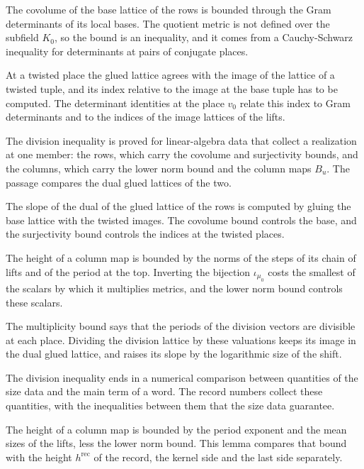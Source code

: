 The covolume of the base lattice of the rows is bounded through the Gram determinants of its local
bases. The quotient metric is not defined over the subfield $K_0$, so the bound is an inequality,
and it comes from a Cauchy-Schwarz inequality for determinants at pairs of conjugate places.

At a twisted place the glued lattice agrees with the image of the lattice of a twisted tuple, and
its index relative to the image at the base tuple has to be computed. The determinant identities at
the place $v_0$ relate this index to Gram determinants and to the indices of the image lattices of
the lifts.

The division inequality is proved for linear-algebra data that collect a realization at one
member: the rows, which carry the covolume and surjectivity bounds, and the columns, which carry the
lower norm bound and the column maps $B_u$. The passage compares the dual glued lattices of the two.

The slope of the dual of the glued lattice of the rows is computed by gluing the base lattice with
the twisted images. The covolume bound controls the base, and the surjectivity bound controls the
indices at the twisted places.

The height of a column map is bounded by the norms of the steps of its chain of lifts and of the
period at the top. Inverting the bijection $\iota_{\mu_0}$ costs the smallest of the scalars by
which it multiplies metrics, and the lower norm bound controls these scalars.

The multiplicity bound says that the periods of the division vectors are divisible at each place.
Dividing the division lattice by these valuations keeps its image in the dual glued lattice, and
raises its slope by the logarithmic size of the shift.

The division inequality ends in a numerical comparison between quantities of the size data and the
main term of a word. The record numbers collect these quantities, with the inequalities between
them that the size data guarantee.

The height of a column map is bounded by the period exponent and the mean sizes of the lifts, less
the lower norm bound. This lemma compares that bound with the height $h^{\mathrm{rec}}$ of the record,
the kernel side and the last side separately.

